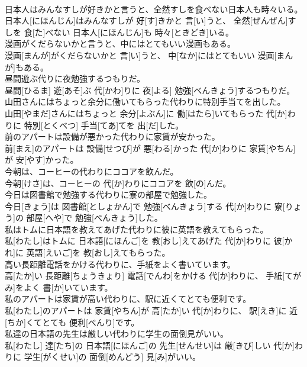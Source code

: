 \documentclass[8pt]{extreport}
\begin{document}
\begin{CJK}{UTF8}{min}
\\	日本人はみんなすしが好きかと言うと、全然すしを食べない日本人も時々いる。	
\\	日本人[にほんじん]はみんなすしが 好[す]きかと 言[い]うと、 全然[ぜんぜん]すしを 食[た]べない 日本人[にほんじん]も 時々[ときどき]いる。
\\	漫画がくだらないかと言うと、中にはとてもいい漫画もある。	
\\	漫画[まんが]がくだらないかと 言[い]うと、 中[なか]にはとてもいい 漫画[まんが]もある。
\\	昼間遊ぶ代りに夜勉強するつもりだ。	
\\	昼間[ひるま] 遊[あそ]ぶ 代[かわ]りに 夜[よる] 勉強[べんきょう]するつもりだ。
\\	山田さんにはちょっと余分に働いてもらった代わりに特別手当てを出した。	
\\	山田[やまだ]さんにはちょっと 余分[よぶん]に 働[はたら]いてもらった 代[か]わりに 特別[とくべつ] 手当[てあ]てを 出[だ]した。
\\	前のアパートは設備が悪かった代わりに家賃が安かった。	
\\	前[まえ]のアパートは 設備[せつび]が 悪[わる]かった 代[か]わりに 家賃[やちん]が 安[やす]かった。
\\	今朝は、コーヒーの代わりにココアを飲んだ。	
\\	今朝[けさ]は、コーヒーの 代[か]わりにココアを 飲[の]んだ。
\\	今日は図書館で勉強する代わりに寮の部屋で勉強した。	
\\	今日[きょう]は 図書館[としょかん]で 勉強[べんきょう]する 代[か]わりに 寮[りょう]の 部屋[へや]で 勉強[べんきょう]した。
\\	私はトムに日本語を教えてあげた代わりに彼に英語を教えてもらった。	
\\	私[わたし]はトムに 日本語[にほんご]を 教[おし]えてあげた 代[か]わりに 彼[かれ]に 英語[えいご]を 教[おし]えてもらった。
\\	高い長距離電話をかける代わりに、手紙をよく書いています。	
\\	高[たか]い 長距離[ちょうきょり] 電話[でんわ]をかける 代[か]わりに、 手紙[てがみ]をよく 書[か]いています。
\\	私のアパートは家賃が高い代わりに、駅に近くてとても便利です。	
\\	私[わたし]のアパートは 家賃[やちん]が 高[たか]い 代[か]わりに、 駅[えき]に 近[ちか]くてとても 便利[べんり]です。
\\	私達の日本語の先生は厳しい代わりに学生の面倒見がいい。	
\\	私[わたし] 達[たち]の 日本語[にほんご]の 先生[せんせい]は 厳[きび]しい 代[か]わりに 学生[がくせい]の 面倒[めんどう] 見[み]がいい。

\end{CJK}
\end{document}
